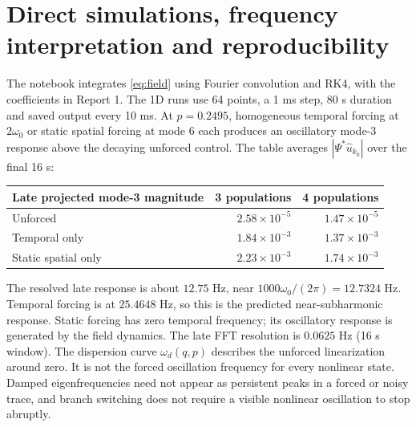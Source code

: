 \documentclass[11pt]{article}
\begin{document}
\section{Direct simulations, frequency interpretation and reproducibility}
The notebook integrates \eqref{eq:field} using Fourier convolution and RK4,
with the coefficients in Report 1. The 1D runs use 64 points, a 1 ms step,
80 s duration and saved output every 10 ms. At $p=0.2495$, homogeneous temporal
forcing at $2\omega_0$ or static spatial forcing at mode 6 each produces an
oscillatory mode-3 response above the decaying unforced control. The table
averages $|\Psi^*\widehat u_{k_0}|$ over the final 16 s:
\begin{center}\small
\begin{tabular}{lrr}\toprule
Late projected mode-3 magnitude&3 populations&4 populations\\\midrule
Unforced&$2.58\times10^{-5}$&$1.47\times10^{-5}$\\
Temporal only&$1.84\times10^{-3}$&$1.37\times10^{-3}$\\
Static spatial only&$2.23\times10^{-3}$&$1.74\times10^{-3}$\\\bottomrule
\end{tabular}
\end{center}
The resolved late response is about $12.75$ Hz, near $1000\omega_0/(2\pi)=12.7324$
Hz. Temporal forcing is at $25.4648$ Hz, so this is
the predicted near-subharmonic response. Static forcing has zero temporal
frequency; its oscillatory response is generated by the field dynamics.
The late FFT resolution is $0.0625$ Hz (16 s window).
The dispersion curve $\omega_d(q,p)$ describes the unforced linearization
around zero. It is not the forced oscillation frequency for every nonlinear
state. Damped eigenfrequencies need not appear as persistent peaks in a
forced or noisy trace, and branch switching does not require a visible
nonlinear oscillation to stop abruptly.
\end{document}
